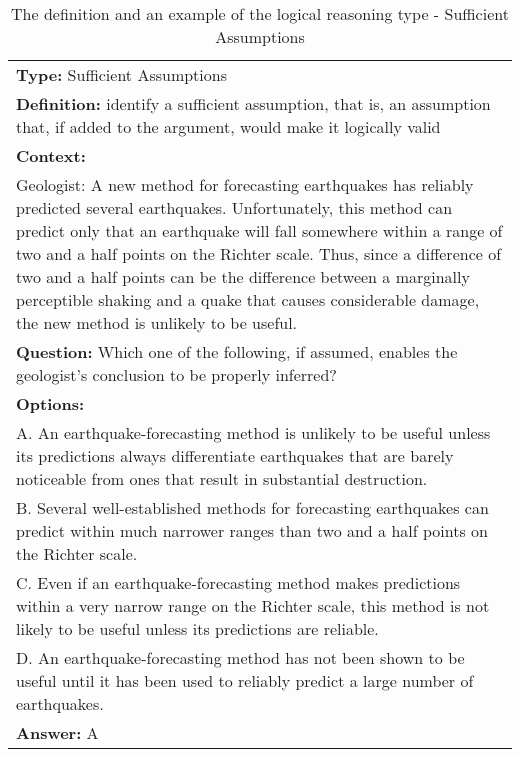 \documentclass{article} \usepackage{iclr2020_conference,times}
\begin{document}
\begin{table}[ht]
	\small
	\centering
	\caption{The definition and an example of the logical reasoning type - Sufficient Assumptions}
	\begin{tabular}{|p{}|}
		\hline
		{\bf Type:} Sufficient Assumptions\\
		{\bf Definition:} identify a sufficient assumption, that is, an assumption that, if added to the argument, would make it logically valid\\
		\hline
        \textbf{Context: } \\
        Geologist: A new method for forecasting earthquakes has reliably predicted several earthquakes. Unfortunately, this method can predict only that an earthquake will fall somewhere within a range of two and a half points on the Richter scale. Thus, since a difference of two and a half points can be the difference between a marginally perceptible shaking and a quake that causes considerable damage, the new method is unlikely to be useful.\\
        \textbf{Question: } Which one of the following, if assumed, enables the geologist's conclusion to be properly inferred?\\
        \textbf{Options: }\\
        A. An earthquake-forecasting method is unlikely to be useful unless its predictions always differentiate earthquakes that are barely noticeable from ones that result in substantial destruction.\\
        B. Several well-established methods for forecasting earthquakes can predict within much narrower ranges than two and a half points on the Richter scale.\\
        C. Even if an earthquake-forecasting method makes predictions within a very narrow range on the Richter scale, this method is not likely to be useful unless its predictions are reliable.\\
        D. An earthquake-forecasting method has not been shown to be useful until it has been used to reliably predict a large number of earthquakes.\\
        \textbf{Answer: }A\\
		\hline
	\end{tabular}
	\label{tab:sufficient-assumptions}
\end{table}
\end{document}
